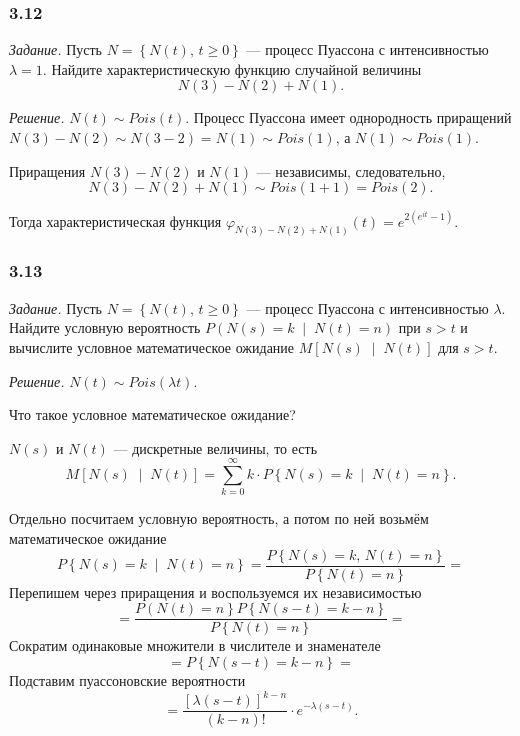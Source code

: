 \subsubsection*{3.12}

\textit{Задание.}
Пусть $N = \left\{ N \left( t \right), \, t \geq 0 \right\} $ ---
процесс Пуассона с интенсивностью $ \lambda = 1$.
Найдите характеристическую функцию случайной величины
$$N \left( 3 \right) - N \left( 2 \right) + N \left( 1 \right).$$

\textit{Решение.}
$N \left( t \right) \sim Pois \left( t \right) $.
Процесс Пуассона имеет однородность приращений
$N \left( 3 \right) - N \left( 2 \right) \sim
  N \left( 3 - 2 \right) =
  N \left( 1 \right)
  \sim Pois \left( 1 \right) $,
а $N \left( 1 \right) \sim Pois \left( 1 \right) $.

Приращения $N \left( 3 \right) - N \left( 2 \right) $ и $N \left( 1 \right) $ --- независимы,
следовательно,
$$N \left( 3 \right) - N \left( 2 \right) + N \left( 1 \right) \sim
  Pois \left( 1 + 1 \right) =
  Pois \left( 2 \right).$$

Тогда характеристическая функция
$ \varphi_{N \left( 3 \right) - N \left( 2 \right) + N \left( 1 \right) } \left( t \right) =
  e^{2 \left( e^{it} - 1 \right) }$.

\subsubsection*{3.13}

\textit{Задание.}
Пусть $N = \left\{ N \left( t \right), \, t \geq 0 \right\} $ ---
процесс Пуассона с интенсивностью $ \lambda $.
Найдите условную вероятность
$P \left( N \left( s \right) = k \; \middle| \; N \left( t \right) = n \right) $ при $s > t$
и вычислите условное математическое ожидание
$M \left[ N \left( s \right) \; \middle| \; N \left( t \right) \right] $ для $s >  t$.

\textit{Решение.}
$N \left( t \right) \sim Pois \left( \lambda t \right) $.

Что такое условное математическое ожидание?

$N \left( s \right) $ и $N \left( t \right) $ --- дискретные величины, то есть
$$M \left[ N \left( s \right) \; \middle| \; N \left( t \right) \right] =
  \sum \limits_{k = 0}^{ \infty }
    k \cdot P \left\{ N \left( s \right) = k \; \middle| \; N \left( t \right) = n \right\}.$$

Отдельно посчитаем условную вероятность, а потом по ней возьмём математическое ожидание
$$P \left\{ N \left( s \right) = k \; \middle| \; N \left( t \right) = n \right\} =
  \frac{P \left\{ N \left( s \right) = k, \, N \left( t \right) = n \right\} }{P \left\{ N \left( t \right) = n \right\} } =$$
Перепишем через приращения и воспользуемся их независимостью
$$= \frac{P \left( N \left( t \right) = n \right\} P \left\{ N \left( s - t \right) = k - n \right\} }{P \left\{ N \left( t \right) = n \right\} } =$$
Сократим одинаковые множители в числителе и знаменателе
$$= P \left\{ N \left( s - t \right) = k - n \right\} =$$
Подставим пуассоновские вероятности
$$= \frac{ \left[ \lambda \left( s - t \right) \right]^{k - n}}{ \left( k - n \right)!} \cdot
  e^{-\lambda \left( s - t \right) }.$$

